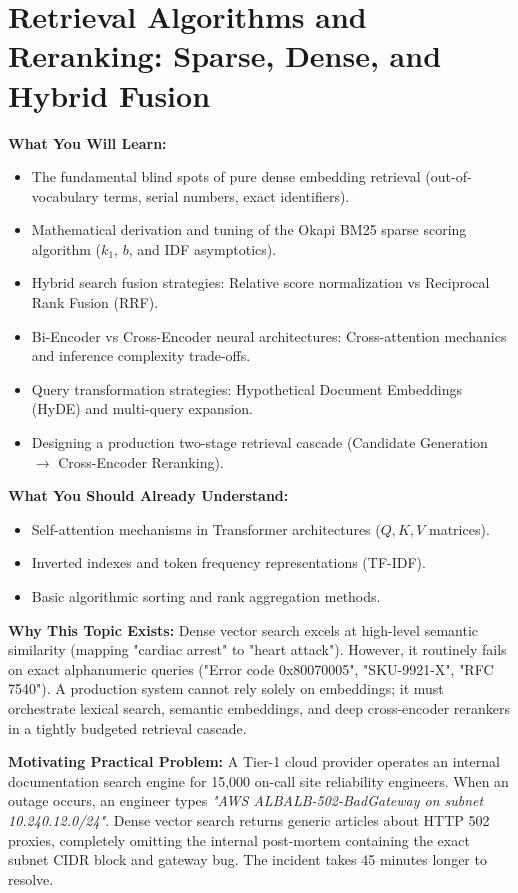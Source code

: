 \chapter{Retrieval Algorithms and Reranking: Sparse, Dense, and Hybrid Fusion}
\label{ch:retrieval_reranking}

\begin{chaptergoalsbox}
\textbf{What You Will Learn:}
\begin{itemize}[leftmargin=15pt]
  \item The fundamental blind spots of pure dense embedding retrieval (out-of-vocabulary terms, serial numbers, exact identifiers).
  \item Mathematical derivation and tuning of the Okapi BM25 sparse scoring algorithm ($k_1$, $b$, and IDF asymptotics).
  \item Hybrid search fusion strategies: Relative score normalization vs Reciprocal Rank Fusion (RRF).
  \item Bi-Encoder vs Cross-Encoder neural architectures: Cross-attention mechanics and inference complexity trade-offs.
  \item Query transformation strategies: Hypothetical Document Embeddings (HyDE) and multi-query expansion.
  \item Designing a production two-stage retrieval cascade (Candidate Generation $\to$ Cross-Encoder Reranking).
\end{itemize}

\textbf{What You Should Already Understand:}
\begin{itemize}[leftmargin=15pt]
  \item Self-attention mechanisms in Transformer architectures ($Q, K, V$ matrices).
  \item Inverted indexes and token frequency representations (TF-IDF).
  \item Basic algorithmic sorting and rank aggregation methods.
\end{itemize}

\textbf{Why This Topic Exists:}
Dense vector search excels at high-level semantic similarity (mapping "cardiac arrest" to "heart attack"). However, it routinely fails on exact alphanumeric queries ("Error code 0x80070005", "SKU-9921-X", "RFC 7540"). A production system cannot rely solely on embeddings; it must orchestrate lexical search, semantic embeddings, and deep cross-encoder rerankers in a tightly budgeted retrieval cascade.

\textbf{Motivating Practical Problem:}
A Tier-1 cloud provider operates an internal documentation search engine for 15,000 on-call site reliability engineers. When an outage occurs, an engineer types \emph{"AWS ALBALB-502-BadGateway on subnet 10.240.12.0/24"}. Dense vector search returns generic articles about HTTP 502 proxies, completely omitting the internal post-mortem containing the exact subnet CIDR block and gateway bug. The incident takes 45 minutes longer to resolve.
\end{chaptergoalsbox}

